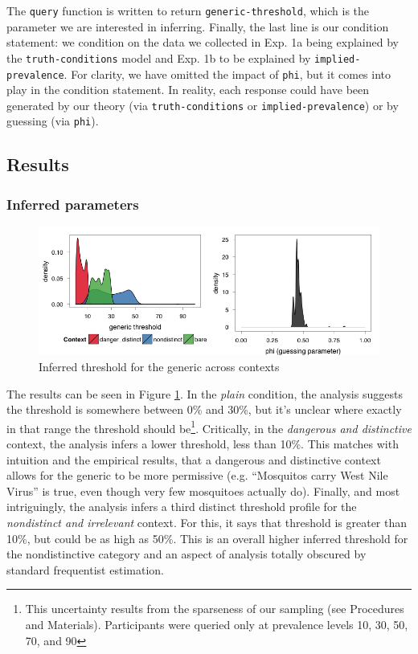 \documentclass[10pt,letterpaper]{article}
\begin{document}
The \lstinline{query} function is written to return \lstinline{generic-threshold}, which is the parameter we are interested in inferring. Finally, the last line is our condition statement: we condition on the data we collected in Exp. 1a being explained by the \lstinline{truth-conditions} model and Exp. 1b to be explained by \lstinline{implied-prevalence}. For clarity, we have omitted the impact of \lstinline{phi}, but it comes into play in the condition statement. In reality, each response could have been generated by our theory (via \lstinline{truth-conditions} or \lstinline{implied-prevalence}) or by guessing (via \lstinline{phi}).  

\subsection{Results}

\subsubsection{Inferred parameters}

\begin{figure}
\centering
    \includegraphics[width=\columnwidth]{fig2_bda1_combined}
    \caption{Inferred threshold for the generic across contexts}
  \label{fig:bda1a}
\end{figure}

The results can be seen in Figure \ref{fig:bda1a}. In the \emph{plain} condition, the analysis suggests the threshold is somewhere between 0\% and 30\%, but it's unclear where exactly in that range the threshold should be\footnote{This uncertainty results from the sparseness of our sampling (see Procedures and Materials). Participants were queried only at prevalence levels 10, 30, 50, 70, and 90}. Critically, in the \emph{dangerous and distinctive} context, the analysis infers a lower threshold, less than 10\%. This matches with intuition and the empirical results, that a dangerous and distinctive context allows for the generic to be more permissive (e.g. ``Mosquitos carry West Nile Virus'' is true, even though very few mosquitoes actually do). Finally, and most intriguingly, the analysis infers a third distinct threshold profile for the \emph{nondistinct and irrelevant} context.  For this, it says that threshold is greater than 10\%, but could be as high as 50\%. This is an overall higher inferred threshold for the nondistinctive category and an aspect of analysis totally obscured by standard frequentist estimation. 
\end{document}
